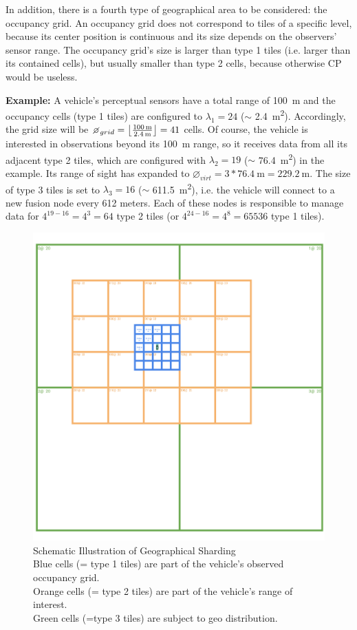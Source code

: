 In addition, there is a fourth type of geographical area to be considered: the occupancy grid. An occupancy grid does not correspond to tiles of a specific level, because its center position is continuous and its size depends on the observers' sensor range. The occupancy grid's size is larger than type 1 tiles (i.e. larger than its contained cells), but usually smaller than type 2 cells, because otherwise CP would be useless. 
\par
\bigskip

\textbf{Example:} A vehicle's perceptual sensors have a total range of \SI{100}{\meter} and the occupancy cells (type 1 tiles) are configured to $\lambda_1 = 24$ ($\sim$ \SI{2.4}{\square\meter}). Accordingly, the grid size will be $\diameter_{grid} = \floor*{\frac{\SI{100}{\meter}}{\SI{2.4}{\meter}}} = 41$ cells. Of course, the vehicle is interested in observations beyond its \SI{100}{\meter} range, so it receives data from all its adjacent type 2 tiles, which are configured with $\lambda_2 = 19$ ($\sim$ \SI{76.4}{\square\meter}) in the example. Its range of sight has expanded to $\diameter_{virt} = 3 * \SI{76.4}{\meter} = \SI{229.2}{\meter}$. The size of type 3 tiles is set to $\lambda_3 = 16$ ($\sim$ \SI{611.5}{\square\meter}), i.e. the vehicle will connect to a new fusion node every 612 meters. Each of these nodes is responsible to manage data for $4^{19-16} = 4^3 = 64$ type 2 tiles (or $4^{24-16} = 4^8 = 65536$ type 1 tiles).

\begin{figure}
	\centering
	\includegraphics[width=0.9\linewidth]{98_images/geo_subscription_schema}
	\caption[Schematic Illustration of Geographical Sharding]{Schematic Illustration of Geographical Sharding \\ Blue cells (= type 1 tiles) are part of the vehicle's observed occupancy grid. \\ Orange cells (= type 2 tiles) are part of the vehicle's range of interest. \\ Green cells (=type 3 tiles) are subject to geo distribution.}
	\label{fig:geo_distribution_schema}
\end{figure}

